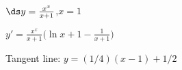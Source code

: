 {$\ds y=\frac{x^{x}}{x+1}$,\quad $x=1$
}
{$y'= \frac{x^x}{x+1}\big(\ln x+1-\frac1{x+1}\big)$

Tangent line: $y = (1/4)(x-1)+ 1/2$
}
